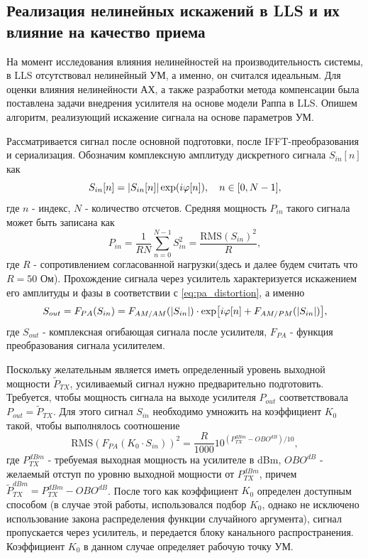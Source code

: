 



\subsection{Реализация нелинейных искажений в LLS и их влияние на качество приема}

На момент исследования влияния нелинейностей на производительность системы,
в LLS отсутствовал нелинейный УМ, а именно, он считался идеальным. Для
оценки влияния нелинейности АХ, а также разработки метода компенсации была
поставлена задачи внедрения усилителя на основе модели Раппа в LLS.
Опишем алгоритм, реализующий искажение сигнала на основе параметров УМ.

Рассматривается сигнал после основной подготовки, после IFFT-преобразования
и сериализация. Обозначим комплексную амплитуду дискретного сигнала
$S_{in}[n]$ как
\begin{equation}
    S_{in}[n] = \abs{S_{in}[n]}\exp(i\varphi[n]),\quad n \in[0, N-1],
\end{equation}
где $n$ - индекс, $N$ - количество отсчетов. Средняя мощность
$P_{in}$ такого сигнала может быть записана как 
\begin{equation}
    P_{in} = \frac{1}{RN}\sum_{n=0}^{N-1}S^2_{in} = \frac{\text{RMS}(S_{in})^2}{R},
\end{equation}
где $R$ - сопротивлением согласованной нагрузки(здесь и далее будем считать
что $R=50$ Ом). Прохождение сигнала через усилитель характеризуется
искажением его амплитуды и фазы в соответствии с \ref{eq:pa_distortion}, а
именно
\begin{equation}
    S_{out} = F_{PA}(S_{in}) = F_{AM/AM}(\abs{S_{in}}) \cdot \exp[i \varphi[n] + F_{AM/PM}(\abs{S_{in}})],
\end{equation}
где $S_{out}$ - комплексная огибающая сигнала после усилителя, $F_{PA}$ -
функция преобразования сигнала усилителем.

Поскольку желательным является иметь определенный уровень
выходной мощности $\tilde{P}_{TX}$, усиливаемый сигнал нужно
предварительно подготовить. Требуется, чтобы мощность сигнала на выходе
усилителя $P_{out}$ соответствовала $P_{out} = \tilde{P}_{TX}$.
Для этого сигнал $S_{in}$ необходимо умножить на коэффициент $K_0$ такой,
чтобы выполнялось соотношение
\begin{equation}
    \displaystyle
    \text{RMS}(F_{PA}(K_0 \cdot S_{in}))^2 = \frac{R}{1000} 10^{\left(P^{dBm}_{TX} - OBO^{dB}\right)/10},
\end{equation}
где $P^{dBm}_{TX}$ - требуемая выходная мощность на усилителе в dBm,
$OBO^{dB}$ - желаемый отступ по уровню выходной мощности от $P^{dBm}_{TX}$,
причем $\tilde{P}^{dBm}_{TX} = P^{dBm}_{TX} - OBO^{dB}$.
После того как коэффициент $K_0$ определен доступным способом (в случае
этой работы, использовался подбор $K_0$, однако не исключено использование
закона распределения функции случайного аргумента), сигнал пропускается
через усилитель, и передается блоку канального распространения. Коэффициент
$K_0$ в данном случае определяет рабочую точку УМ.

